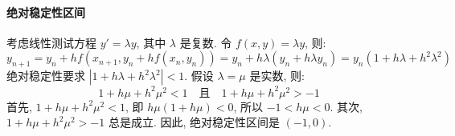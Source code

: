 \documentclass[lang = zh]{iwork}
\begin{document}
\begin{sol}
  \paragraph*{绝对稳定性区间}
  考虑线性测试方程 $y' = \lambda y$, 其中 \(\lambda\) 是复数.
  令 $f(x, y) = \lambda y$, 则:
  \begin{equation*}
    y_{n+1}
    = y_n + h f(x_{n+1}, y_n + h f(x_n, y_n))
    = y_n + h \lambda (y_n + h \lambda y_n) = y_n (1 + h \lambda + h^2 \lambda^2)
  \end{equation*}
  绝对稳定性要求 $|1 + h \lambda + h^2 \lambda^2| < 1$.
  假设 \(\lambda = \mu\) 是实数, 则:
  \begin{equation*}
    1 + h \mu + h^2 \mu^2 < 1 \quad \text{且} \quad 1 + h \mu + h^2 \mu^2 > -1
  \end{equation*}
  首先, $1 + h \mu + h^2 \mu^2 < 1$, 即 $h \mu (1 + h \mu) < 0$, 所以 \(-1 < h \mu < 0\).
  其次, $1 + h \mu + h^2 \mu^2 > -1$ 总是成立.
  因此, 绝对稳定性区间是 $(-1, 0)$.
\end{sol}
\end{document}
